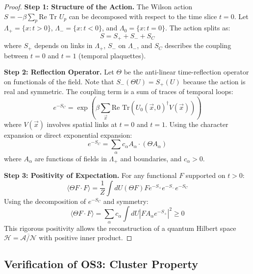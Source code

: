 \begin{proof}
    \textbf{Step 1: Structure of the Action.}
    The Wilson action $S = -\beta \sum_p \text{Re Tr } U_p$ can be decomposed with respect to the time slice $t=0$.
    Let $\Lambda_+ = \{x : t > 0\}$, $\Lambda_- = \{x : t < 0\}$, and $\Lambda_0 = \{x : t=0\}$.
    The action splits as:
    \begin{equation}
        S = S_+ + S_- + S_C
    \end{equation}
    where $S_+$ depends on links in $\Lambda_+$, $S_-$ on $\Lambda_-$, and $S_C$ describes the coupling between $t=0$ and $t=1$ (temporal plaquettes).
    
    \textbf{Step 2: Reflection Operator.}
    Let $\Theta$ be the anti-linear time-reflection operator on functionals of the field.
    Note that $S_-(\Theta U) = S_+(U)$ because the action is real and symmetric.
    The coupling term is a sum of traces of temporal loops:
    \begin{equation}
        e^{-S_C} = \exp\left( \beta \sum_{\vec{x}} \text{Re Tr} (U_0(\vec{x}, 0)^\dagger V(\vec{x})) \right)
    \end{equation}
    where $V(\vec{x})$ involves spatial links at $t=0$ and $t=1$.
    Using the character expansion or direct exponential expansion:
    \begin{equation}
        e^{-S_C} = \sum_\alpha c_\alpha A_\alpha \cdot (\Theta A_\alpha)
    \end{equation}
    where $A_\alpha$ are functions of fields in $\Lambda_+$ and boundaries, and $c_\alpha > 0$.
    
    \textbf{Step 3: Positivity of Expectation.}
    For any functional $F$ supported on $t>0$:
    \begin{equation}
        \langle \Theta F \cdot F \rangle = \frac{1}{Z} \int dU (\Theta F) F e^{-S_+} e^{-S_-} e^{-S_C}
    \end{equation}
    Using the decomposition of $e^{-S_C}$ and symmetry:
    \begin{equation}
        \langle \Theta F \cdot F \rangle = \sum_\alpha c_\alpha \int dU |F A_\alpha e^{-S_+}|^2 \ge 0
    \end{equation}
    This rigorous positivity allows the reconstruction of a quantum Hilbert space $\mathcal{H} = \overline{\mathcal{A} / \mathcal{N}}$ with positive inner product.
\end{proof}

\subsection{Verification of OS3: Cluster Property}

